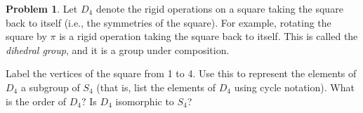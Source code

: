 \documentclass[12pt,reqno]{article}
\theoremstyle{plain}
\theoremstyle{definition}
\newtheorem{problem}{Problem}
\begin{document}
\newpage


\begin{problem} 
    Let $D_4$ denote the rigid operations on a square taking the square back to itself (i.e., the symmetries of the square). For example, rotating the square by $\pi$ is a rigid operation taking the square back to itself. This is called the \emph{dihedral group}, and it is a group under composition.
    
    Label the vertices of the square from 1 to 4. Use this to represent the elements of $D_4$ a subgroup of $S_4$ (that is, list the elements of $D_4$ using cycle notation). What is the order of $D_4?$ Is $D_4$ isomorphic to $S_4$?
\end{problem}
\end{document}
